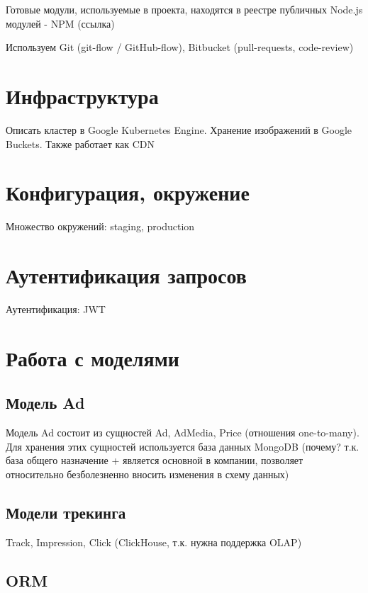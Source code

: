 \documentclass[times]{itmo-student-thesis}
\begin{document}
Готовые модули, используемые в проекта, находятся в реестре публичных Node.js модулей - NPM (ссылка)

Используем Git (git-flow / GitHub-flow), Bitbucket (pull-requests, code-review)

\section{Инфраструктура}

Описать кластер в Google Kubernetes Engine. Хранение изображений в Google Buckets. Также работает как CDN

\section{Конфигурация, окружение}

Множество окружений: staging, production \cite{twelve-factor-app}

\section{Аутентификация запросов}

Аутентификация: JWT

\section{Работа с моделями}

\subsection{Модель Ad}

Модель Ad состоит из сущностей Ad, AdMedia, Price (отношения one-to-many). Для хранения этих сущностей используется база данных MongoDB \cite{mongodb} (почему? т.к. база общего назначение + является основной в компании, позволяет относительно безболезненно вносить изменения в схему данных)

\subsection{Модели трекинга}

Track, Impression, Click (ClickHouse, т.к. нужна поддержка OLAP)

\subsection{ORM}
\end{document}
